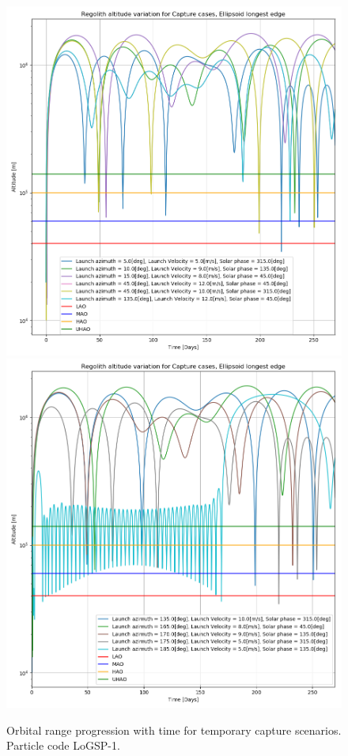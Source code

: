 \FloatBarrier
\begin{figure}[p]
\centering
\captionsetup{justification=centering}
\includegraphics[scale=0.5]{longest_edge_perturbations/3.2Density_1cmSize/altitude_versus_time_all_cases_part_1.png}
\includegraphics[scale=0.5]{longest_edge_perturbations/3.2Density_1cmSize/altitude_versus_time_all_cases_part_2.png}
\caption{Orbital range progression with time for temporary capture scenarios. Particle code LoGSP-1.}
\label{fig:LoGSP_1_capture_orbital_range}
\end{figure}
